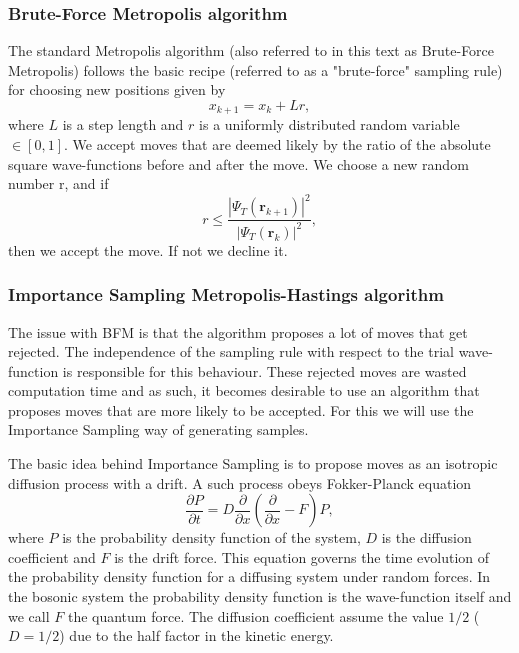 \subsubsection{Brute-Force Metropolis algorithm}
The standard Metropolis algorithm (also referred to in this text as Brute-Force Metropolis) follows the basic recipe (referred to as a "brute-force" sampling rule) for choosing new positions given by
\begin{equation*}
x_{k+1} = x_k + Lr,
\end{equation*}
where $L$ is a step length and $r$ is a uniformly distributed random variable $\in [0,1]$. We accept moves that are deemed likely by the ratio of the absolute square wave-functions before and after the move. We choose a new random number r, and if
\begin{equation}
r \leq \frac{|\Psi_T(\textbf{r}_{k+1})|^2}{|\Psi_T(\textbf{r}_{k})|^2},
\label{eq_accept_move}
\end{equation}
then we accept the move. If not we decline it. 

\subsubsection{Importance Sampling Metropolis-Hastings algorithm}
The issue with BFM is that the algorithm proposes a lot of moves that get rejected. The independence of the sampling rule with respect to the trial wave-function is responsible for this behaviour. These rejected moves are wasted computation time and as such, it becomes desirable to use an algorithm that proposes moves that are more likely to be accepted. For this we will use the Importance Sampling way of generating samples.

The basic idea behind Importance Sampling is to propose moves as an isotropic diffusion
process with a drift. A such process obeys Fokker-Planck equation 
\begin{equation*}
\frac{\partial P}{\partial t} = D\frac{\partial}{\partial x}\left(\frac{\partial}{\partial x}-F\right)P,
\end{equation*}
where $P$ is the probability density function of the system, $D$ is the diffusion coefficient and $F$ is the drift force. This equation governs the time evolution of the probability density function for a diffusing system under random forces. In the bosonic system the probability density function is the wave-function itself and we call $F$ the quantum force. The diffusion coefficient assume the value $1/2$ ($D = 1/2$) due to the half factor in the kinetic energy. 

